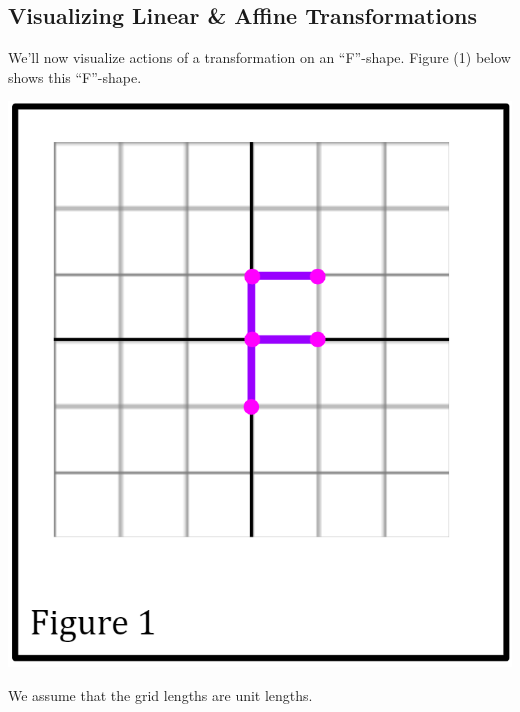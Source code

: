 \documentclass[letterpaper]{article}
\begin{document}
\subsection{Visualizing Linear \& Affine Transformations}
We'll now visualize actions of a transformation on an ``F''-shape. Figure (1) below shows this ``F''-shape. 
\begin{center}
    \includegraphics[scale=0.3]{../assets/f0.png}
\end{center}
We assume that the grid lengths are unit lengths. 
\end{document}
